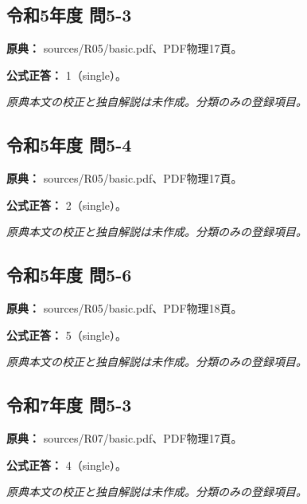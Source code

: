 \subsection{令和5年度 問5-3}
\label{q:r05-reg-basic-5-3}

\noindent\textbf{原典：} sources/R05/basic.pdf、PDF物理17頁。

\textbf{公式正答：} 1（single）。

\par\textit{原典本文の校正と独自解説は未作成。分類のみの登録項目。}

\subsection{令和5年度 問5-4}
\label{q:r05-reg-basic-5-4}

\noindent\textbf{原典：} sources/R05/basic.pdf、PDF物理17頁。

\textbf{公式正答：} 2（single）。

\par\textit{原典本文の校正と独自解説は未作成。分類のみの登録項目。}

\subsection{令和5年度 問5-6}
\label{q:r05-reg-basic-5-6}

\noindent\textbf{原典：} sources/R05/basic.pdf、PDF物理18頁。

\textbf{公式正答：} 5（single）。

\par\textit{原典本文の校正と独自解説は未作成。分類のみの登録項目。}

\subsection{令和7年度 問5-3}
\label{q:r07-reg-basic-5-3}

\noindent\textbf{原典：} sources/R07/basic.pdf、PDF物理17頁。

\textbf{公式正答：} 4（single）。

\par\textit{原典本文の校正と独自解説は未作成。分類のみの登録項目。}
